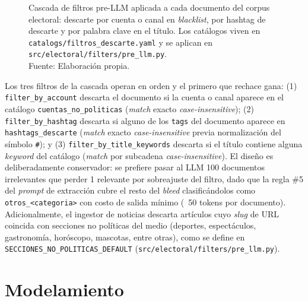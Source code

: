 \begin{figure}[!ht]
    \begin{center}
        \resizebox{0.85\textwidth}{!}{}
        \caption[Cascada de filtros pre-LLM por catálogos YAML]{Cascada de filtros pre-LLM aplicada a cada documento del corpus electoral: descarte por cuenta o canal en \textit{blacklist}, por hashtag de descarte y por palabra clave en el título. Los catálogos viven en \texttt{catalogs/filtros\_descarte.yaml} y se aplican en \texttt{src/electoral/filters/pre\_llm.py}.\\
            Fuente: Elaboración propia.}
        \label{5:fig15}
    \end{center}
\end{figure}

Los tres filtros de la cascada operan en orden y el primero que rechace gana:
(1) \texttt{filter\_by\_account} descarta el documento si la cuenta o canal aparece
en el catálogo \texttt{cuentas\_no\_politicas} (\textit{match} exacto
\textit{case-insensitive}); (2) \texttt{filter\_by\_hashtag} descarta si alguno de
los \texttt{tags} del documento aparece en \texttt{hashtags\_descarte} (\textit{match}
exacto \textit{case-insensitive} previa normalización del símbolo \texttt{\#}); y
(3) \texttt{filter\_by\_title\_keywords} descarta si el título contiene alguna
\textit{keyword} del catálogo (\textit{match} por subcadena
\textit{case-insensitive}). El diseño es deliberadamente conservador: se prefiere
pasar al LLM 100 documentos irrelevantes que perder 1 relevante por sobreajuste
del filtro, dado que la regla \#5 del \textit{prompt} de extracción cubre el resto
del \textit{bleed} clasificándolos como \texttt{otros\_<categoria>} con costo de
salida mínimo (~50 tokens por documento). Adicionalmente, el ingestor de noticias
descarta artículos cuyo \textit{slug} de URL coincida con secciones no políticas
del medio (deportes, espectáculos, gastronomía, horóscopo, mascotas, entre otras),
como se define en \texttt{SECCIONES\_NO\_POLITICAS\_DEFAULT}
(\texttt{src/electoral/filters/pre\_llm.py}).

\section{Modelamiento}

